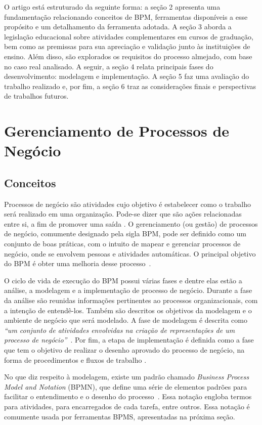 \documentclass[12pt]{article}
\begin{document}
O artigo está estruturado da seguinte forma: a seção 2 apresenta uma fundamentação relacionando conceitos de BPM, ferramentas disponíveis a esse propósito e um detalhamento da ferramenta adotada. A seção 3 aborda a legislação educacional sobre atividades complementares em cursos de graduação, bem como as premissas para sua apreciação e validação junto às instituições de ensino. Além disso, são explorados os requisitos do processo almejado, com base no caso real analisado. A seguir, a seção 4 relata principais fases do desenvolvimento: modelagem e implementação. A seção 5 faz uma avaliação do trabalho realizado e, por fim, a seção 6 traz as considerações finais e perspectivas de trabalhos futuros.


\section{Gerenciamento de Processos de Negócio}

\subsection{Conceitos}

Processos de negócio são atividades cujo objetivo é estabelecer como o trabalho será realizado em uma organização. Pode-se dizer que são ações relacionadas entre si, a fim de promover uma saída \cite{ABPMP}. O gerenciamento (ou gestão) de processos de negócio, comumente designado pela sigla BPM, pode ser definido como um conjunto de boas práticas, com o intuito de mapear e gerenciar processos de negócio, onde se envolvem pessoas e atividades automáticas. O principal objetivo do BPM é obter uma melhoria desse processo~\cite{weske}.

O ciclo de vida de execução do BPM possui várias fases e dentre elas estão a análise, a modelagem e a implementação de processo de negócio. Durante a fase da análise são reunidas informações pertinentes ao processos organizacionais, com a intenção de entendê-los. Também são descritos os objetivos da modelagem e o ambiente de negócio que será modelado. A fase de modelagem é descrita como \emph{“um conjunto de atividades envolvidas na criação de representações de um processo de negócio”}~\cite{ABPMP}. Por fim, a etapa de implementação é definida como a fase que tem o objetivo de realizar o desenho aprovado do processo de negócio, na forma de procedimentos e fluxos de trabalho \cite{ABPMP}.

	No que diz respeito à modelagem, existe um padrão chamado \emph{Business Process Model and Notation} (BPMN), que define  uma série de elementos padrões para facilitar o entendimento e o desenho do processo~\cite{BPMN}. Essa notação engloba termos para atividades, para encarregados de cada tarefa, entre outros. Essa notação é comumente usada por ferramentas BPMS, apresentadas na próxima seção.
\end{document}
